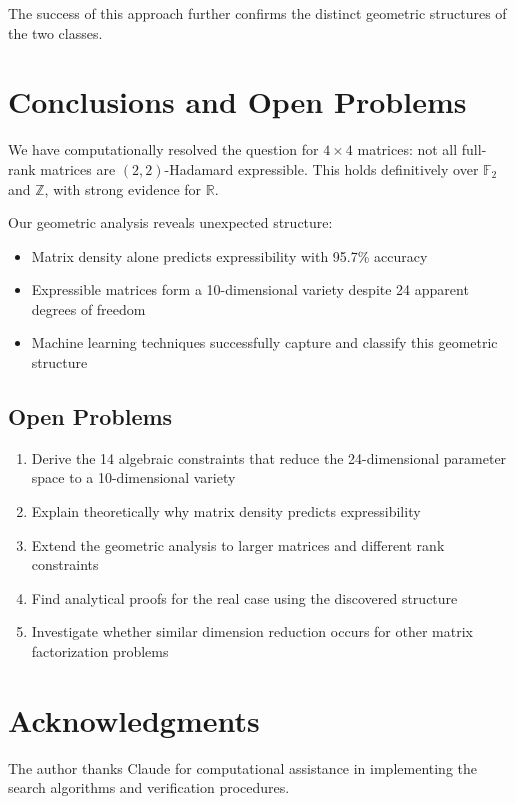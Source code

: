 \documentclass[11pt]{amsart}
\theoremstyle{plain}
\theoremstyle{definition}
\theoremstyle{remark}
\begin{document}
The success of this approach further confirms the distinct geometric structures of the two classes.

\section{Conclusions and Open Problems}

We have computationally resolved the question for $4 \times 4$ matrices: not all full-rank matrices are $(2,2)$-Hadamard expressible. This holds definitively over $\mathbb{F}_2$ and $\mathbb{Z}$, with strong evidence for $\mathbb{R}$.

Our geometric analysis reveals unexpected structure:
\begin{itemize}
\item Matrix density alone predicts expressibility with 95.7\% accuracy
\item Expressible matrices form a 10-dimensional variety despite 24 apparent degrees of freedom
\item Machine learning techniques successfully capture and classify this geometric structure
\end{itemize}

\subsection{Open Problems}

\begin{enumerate}
\item Derive the 14 algebraic constraints that reduce the 24-dimensional parameter space to a 10-dimensional variety
\item Explain theoretically why matrix density predicts expressibility
\item Extend the geometric analysis to larger matrices and different rank constraints
\item Find analytical proofs for the real case using the discovered structure
\item Investigate whether similar dimension reduction occurs for other matrix factorization problems
\end{enumerate}

\section*{Acknowledgments}

The author thanks Claude for computational assistance in implementing the search algorithms and verification procedures.
\end{document}
